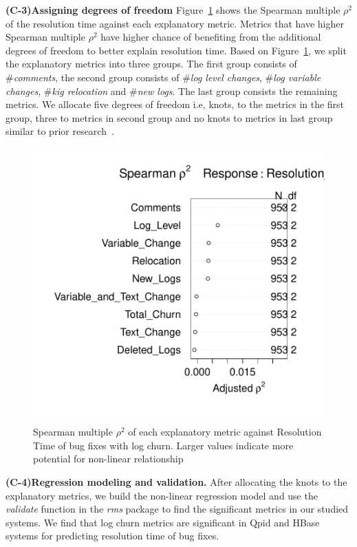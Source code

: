\textbf{(C-3)Assigning degrees of freedom} Figure~\ref{fig:Spearman} shows the Spearman multiple $\rho^{2}$ of the resolution time against each explanatory metric. Metrics that have higher Spearman multiple $\rho^{2}$ have higher chance of benefiting from the additional degrees of freedom to better explain resolution time. Based on Figure~\ref{fig:Spearman}, we split the explanatory metrics into three groups. The first group consists of \#\textsl{comments}, the second group consists of \#\textsl{log level changes}, \#\textsl{log variable changes}, \#\textsl{kig relocation} and \#\textsl{new logs}. The last group consists the remaining metrics. We allocate five degrees of freedom i.e, knots, to the metrics in the first group, three to metrics in second group and no knots to metrics in last group similar to prior research~\cite{ShaneOLS}.


\begin{figure}[t]
	\begin{minipage}[b]{.7\columnwidth}
		
		\includegraphics[width=.8\columnwidth]{QpidDF}	
		
	\end{minipage}
	\captionsetup{labelsep = colon}
	\hspace*{1.7cm}\caption{Spearman multiple $\rho^{2}$ of each explanatory metric against Resolution Time of bug fixes with log churn. Larger values indicate more potential for non-linear relationship \label{fig:Spearman}}
\end{figure}




\textbf{(C-4)Regression modeling and validation.} After allocating the knots to the explanatory metrics, we build the non-linear regression model and use the \textsl{validate} function in the \textsl{rms} package to find the significant metrics in our studied systems. We find that log churn metrics are significant in Qpid and HBase systems for predicting resolution time of bug fixes. 

